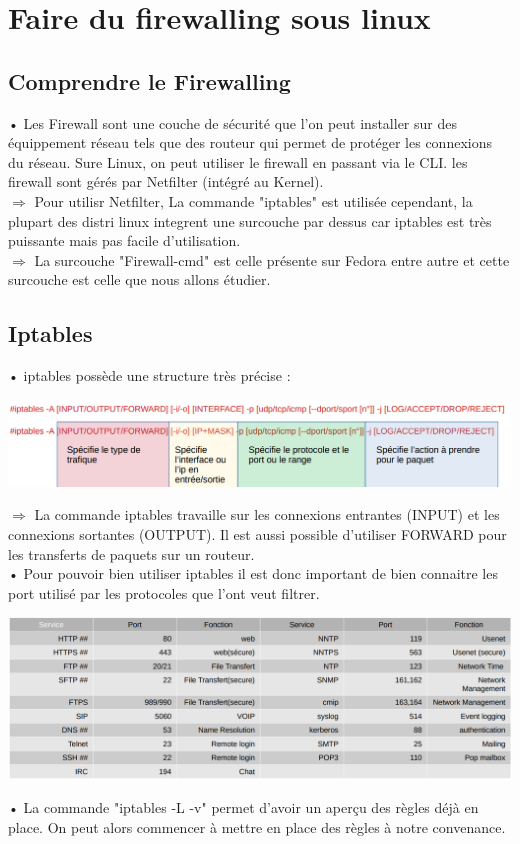 \documentclass[a4paper, 11pt, french, oneside]{book}
\begin{document}
			
	\chapter{Faire du firewalling sous linux}
		\section{Comprendre le Firewalling}
			• Les Firewall sont une couche de sécurité que l'on peut installer sur des équippement réseau tels que des routeur qui permet de protéger les connexions du réseau. Sure Linux, on peut utiliser le firewall en passant via le CLI. les firewall sont gérés par Netfilter (intégré au Kernel).\\
			$\Rightarrow$ Pour utilisr Netfilter, La commande "iptables" est utilisée cependant, la plupart des distri linux integrent une surcouche par dessus car iptables est très puissante mais pas facile d'utilisation. \\
			$\Rightarrow$ La surcouche "Firewall-cmd" est celle présente sur Fedora entre autre et cette surcouche est celle que nous allons étudier.\\
			
		\section{Iptables}
			• iptables possède une structure très précise : \\
			\begin{flushleft}
				\includegraphics[scale=0.6]{iptablesNotation.png}
			\end{flushleft}
			$\Rightarrow$ La commande iptables travaille sur les connexions entrantes (INPUT) et les connexions sortantes (OUTPUT). Il est aussi possible d'utiliser FORWARD pour les transferts de paquets sur un routeur. \\
			
			• Pour pouvoir bien utiliser iptables il est donc important de bien connaitre les port utilisé par les protocoles que l'ont veut filtrer. \\
			\begin{flushleft}
				\includegraphics[scale=0.5]{WellKnownPort.png}
			\end{flushleft}
			• La commande "iptables -L -v" permet d'avoir un aperçu des règles déjà en place. On peut alors commencer à mettre en place des règles à notre convenance.\\
\end{document}

